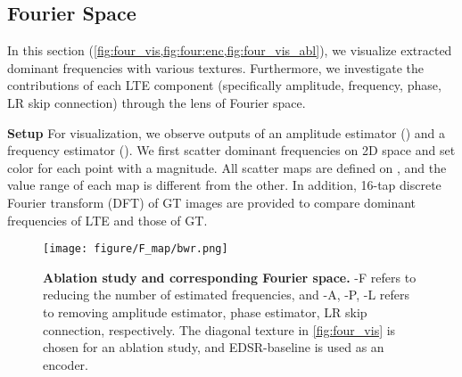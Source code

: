 \documentclass[10pt,twocolumn,letterpaper]{article}
\begin{document}
\subsection{Fourier Space}
\label{sec:fourier}
In this section (\cref{fig:four_vis,fig:four:enc,fig:four_vis_abl}), we visualize extracted dominant frequencies with various textures. Furthermore, we investigate the contributions of each LTE component (specifically amplitude, frequency, phase, LR skip connection) through the lens of Fourier space.

\textbf{Setup} For visualization, we observe outputs of an amplitude estimator () and a frequency estimator (). We first scatter dominant frequencies on 2D space and set color for each point with a magnitude. All scatter maps are defined on , and the value range of each map is different from the other. In addition, 16-tap discrete Fourier transform (DFT) of GT images are provided to compare dominant frequencies of LTE and those of GT.

\begin{figure}[t]
\footnotesize
\centering
{}
\texttt{[image: figure/F\_map/bwr.png]}
\vspace*{-6pt}
\caption{\textbf{Ablation study and corresponding Fourier space.} -F refers to reducing the number of estimated frequencies, and -A, -P, -L refers to removing amplitude estimator, phase estimator, LR skip connection, respectively. The diagonal texture in \cref{fig:four_vis} is chosen for an ablation study, and EDSR-baseline \cite{Lim_2017_CVPR_Workshops} is used as an encoder.}
\label{fig:four_vis_abl}
\end{figure}
\end{document}
